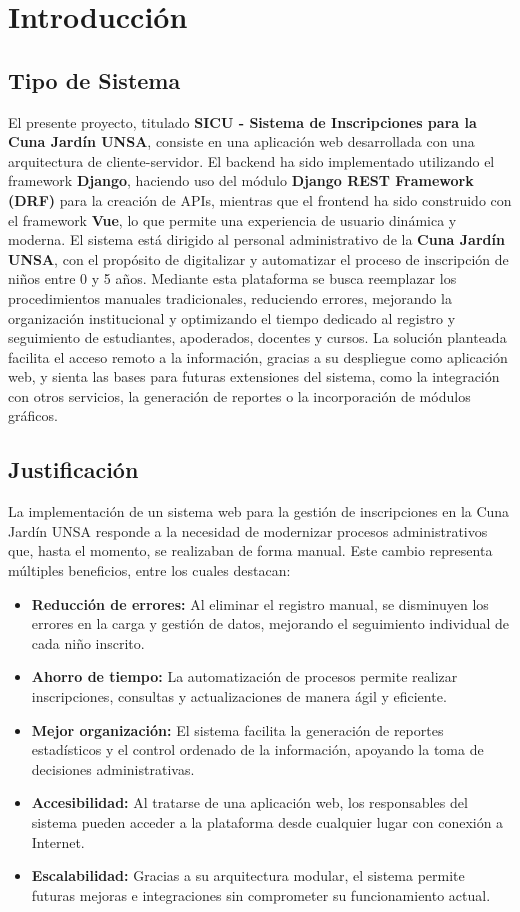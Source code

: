 \documentclass{article}
\begin{document}
\section{Introducción}
    \subsection{Tipo de Sistema}
        El presente proyecto, titulado \textbf{SICU - Sistema de Inscripciones para la Cuna Jardín UNSA}, consiste en una aplicación web desarrollada con una arquitectura de cliente-servidor. El backend ha sido implementado utilizando el framework \textbf{Django}, haciendo uso del módulo \textbf{Django REST Framework (DRF)} para la creación de APIs, mientras que el frontend ha sido construido con el framework \textbf{Vue}, lo que permite una experiencia de usuario dinámica y moderna.
        El sistema está dirigido al personal administrativo de la \textbf{Cuna Jardín UNSA}, con el propósito de digitalizar y automatizar el proceso de inscripción de niños entre 0 y 5 años. Mediante esta plataforma se busca reemplazar los procedimientos manuales tradicionales, reduciendo errores, mejorando la organización institucional y optimizando el tiempo dedicado al registro y seguimiento de estudiantes, apoderados, docentes y cursos.
        La solución planteada facilita el acceso remoto a la información, gracias a su despliegue como aplicación web, y sienta las bases para futuras extensiones del sistema, como la integración con otros servicios, la generación de reportes o la incorporación de módulos gráficos.
    \subsection{Justificación}
        La implementación de un sistema web para la gestión de inscripciones en la Cuna Jardín UNSA responde a la necesidad de modernizar procesos administrativos que, hasta el momento, se realizaban de forma manual. Este cambio representa múltiples beneficios, entre los cuales destacan:
        \begin{itemize}
            \item \textbf{Reducción de errores:} Al eliminar el registro manual, se disminuyen los errores en la carga y gestión de datos, mejorando el seguimiento individual de cada niño inscrito.
            \item \textbf{Ahorro de tiempo:} La automatización de procesos permite realizar inscripciones, consultas y actualizaciones de manera ágil y eficiente.
            \item \textbf{Mejor organización:} El sistema facilita la generación de reportes estadísticos y el control ordenado de la información, apoyando la toma de decisiones administrativas.
            \item \textbf{Accesibilidad:} Al tratarse de una aplicación web, los responsables del sistema pueden acceder a la plataforma desde cualquier lugar con conexión a Internet.
            \item \textbf{Escalabilidad:} Gracias a su arquitectura modular, el sistema permite futuras mejoras e integraciones sin comprometer su funcionamiento actual.
        \end{itemize}
\end{document}
